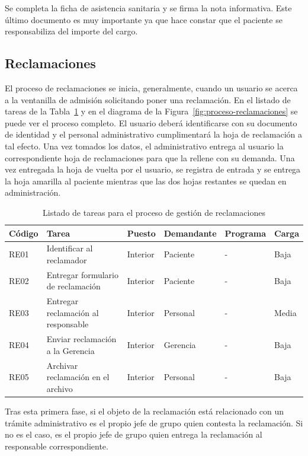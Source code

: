Se completa la ficha de asistencia sanitaria y se firma la nota informativa.
Este último documento es muy importante ya que hace constar que el paciente se responsabiliza del importe del cargo.

\subsection{Reclamaciones}

El proceso de reclamaciones se inicia, generalmente, cuando un usuario se acerca a la ventanilla de admisión solicitando poner una reclamación.
En el listado de tareas de la Tabla~\ref{tab:proceso-reclamaciones} y en el diagrama de la Figura~\ref{fig:proceso-reclamaciones} se puede ver el proceso completo.
El usuario deberá identificarse con su documento de identidad y el personal administrativo cumplimentará la hoja de reclamación a tal efecto.
Una vez tomados los datos, el administrativo entrega al usuario la correspondiente hoja de reclamaciones para que la rellene con su demanda.
Una vez entregada la hoja de vuelta por el usuario, se registra de entrada y se entrega la hoja amarilla al paciente mientras que las dos hojas restantes se quedan en administración.

\begin{table}[H]
    \begin{tabular}{lp{5cm}llll}
        \toprule
        Código & Tarea                               & Puesto   & Demandante & Programa & Carga \\
        \midrule
        RE01   & Identificar al reclamador           & Interior & Paciente   & -        & Baja  \\
        RE02   & Entregar formulario de reclamación  & Interior & Paciente   & -        & Baja  \\
        RE03   & Entregar reclamación al responsable & Interior & Personal   & -        & Media \\
        RE04   & Enviar reclamación a la Gerencia    & Interior & Gerencia   & -        & Baja  \\
        RE05   & Archivar reclamación en el archivo  & Interior & Personal   & -        & Baja  \\
        \bottomrule
    \end{tabular}
    \caption{Listado de tareas para el proceso de gestión de reclamaciones}
    \label{tab:proceso-reclamaciones}
\end{table}

Tras esta primera fase, si el objeto de la reclamación está relacionado con un trámite administrativo es el propio jefe de grupo quien contesta la reclamación.
Si no es el caso, es el propio jefe de grupo quien entrega la reclamación al responsable correspondiente.

